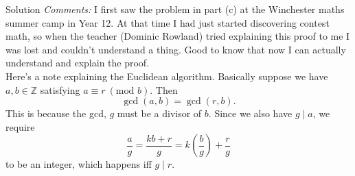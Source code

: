 \documentclass{article}
\begin{document}
\begin{solution}{Solution}
\textit{Comments:} I first saw the problem in part (c) at the Winchester
maths summer camp in Year 12. At that time I had just started discovering
contest math, so when the teacher (Dominic Rowland) tried explaining this
proof to me I was lost and couldn't understand a thing. Good to know that
now I can actually understand and explain the proof. \\

Here's a note explaining the Euclidean algorithm. Basically
suppose we have $a,b \in \mathbb{Z}$ satisfying
$a \equiv r \ (\text{mod } b)$. Then
$$
\gcd(a,b) = \gcd(r, b).
$$
This is because the gcd, $g$ must be a divisor of $b$. Since we also have
$g \mid a$, we require
$$
\frac{a}{g} = \frac{kb + r}{g} = k\left(\frac{b}{g}\right) + \frac{r}{g}
$$
to be an integer, which happens iff $g \mid r$.
\end{solution}
\end{document}
